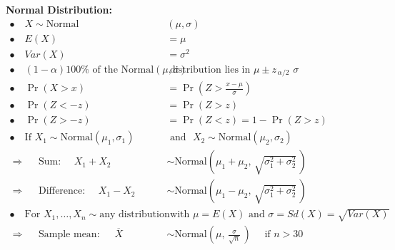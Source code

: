 \documentclass[12pt]{article}
\begin{document}
{\bf Normal Distribution:}\\[-0.6cm]
\begin{align*}
\bullet\quad X \sim \text{Normal}&(\mu,\sigma) \\[0.4cm]
\bullet\quad E(X) &= \mu \\[0.4cm]
\bullet\quad Var(X) &= \sigma^2 \\[0.4cm]
\bullet\quad (1-\alpha)100\% \text{ of the Normal}(\mu,\sigma) & \text{ distribution lies in } \mu \pm z_{\,\alpha/2}\,\,\sigma \\[0.4cm]
\bullet\quad \Pr(X > x) &= \Pr\left(Z> \frac{x-\mu}{\sigma}\right)\\[1cm]
\bullet\quad \Pr(Z < -z) &= \Pr(Z > z) \\[0.6cm]
\bullet\quad \Pr(Z > -z) &= \Pr(Z < z) = 1 -\Pr(Z>z) \\[1cm]
\bullet\quad \text{If} \,\,  X_1 \sim \text{Normal}(\mu_1,\sigma_1) \,\,  & \text{ and } \,\, X_2 \sim \text{Normal}(\mu_2,\sigma_2) \\[0.4cm]
\Rightarrow \quad  \text{ Sum: } \quad  X_1 + X_2 &\sim \text{Normal}\left(\mu_1+\mu_2,\,\sqrt{\sigma_1^2+\sigma_2^2}\,\right) \\[0.4cm]
\Rightarrow \quad  \text{ Difference: } \quad   X_1 - X_2 &\sim \text{Normal}\left(\mu_1-\mu_2,\,\sqrt{\sigma_1^2+\sigma_2^2}\,\right) \\[1cm]
\bullet\quad \text{For} \,\,  X_1,\ldots,X_n \sim \text{any distribution} & \text{ with } \mu = E(X) \text{ and } \sigma = Sd(X) = \sqrt{Var(X)}\\[0.4cm]
\Rightarrow \quad  \text{ Sample mean: } \quad  \,\overline{\!X} &\sim \text{Normal}\left(\mu,\,\frac{\sigma}{\sqrt{n}}\,\right) \quad \text{ if } n > 30
\end{align*}

\newpage
\end{document}
